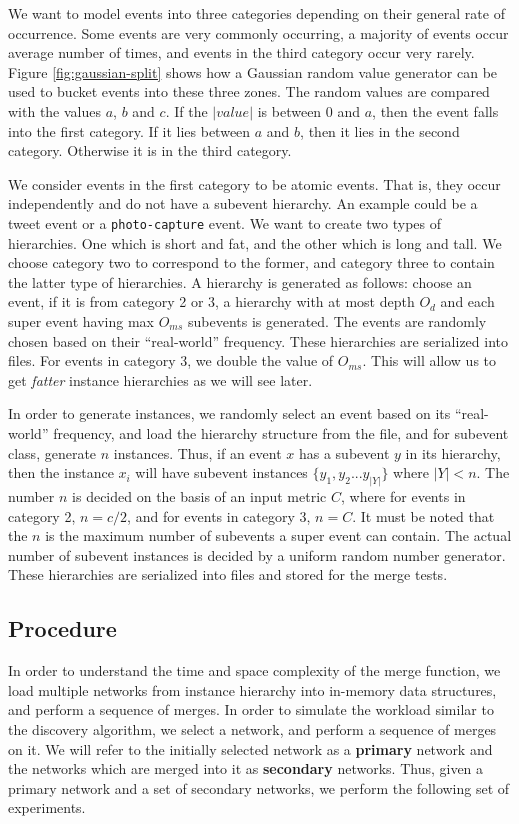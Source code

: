 We want to model events into three categories depending on their general rate of occurrence. Some events are very commonly occurring, a majority of events occur average number of times, and events in the third category occur very rarely. Figure \ref{fig:gaussian-split} shows how a Gaussian random value generator can be used to bucket events into these three zones. The random values are compared with the values $a$, $b$ and $c$. If the $|value|$ is between 0 and $a$, then the event falls into the first category. If it lies between $a$ and $b$, then it lies in the second category. Otherwise it is in the third category.

We consider events in the first category to be atomic events. That is, they occur independently and do not have a subevent hierarchy. An example could be a tweet event or a \texttt{photo-capture} event. We want to create two types of hierarchies. One which is short and fat, and the other which is long and tall. We choose category two to correspond to the former, and category three to contain the latter type of hierarchies. A hierarchy is generated as follows: choose an event, if it is from category 2 or 3, a hierarchy with at most depth $O_d$ and each super event having max $O_{ms}$ subevents is generated. The events are randomly chosen based on their ``real-world'' frequency. These hierarchies are serialized into files. For events in category 3, we double the value of $O_{ms}$. This will allow us to get \textit{fatter} instance hierarchies as we will see later.

In order to generate instances, we randomly select an event based on its ``real-world'' frequency, and load the hierarchy structure from the file, and for subevent class, generate $n$ instances. Thus, if an event $x$ has a subevent $y$ in its hierarchy, then the instance $x_i$ will have subevent instances $\{y_1, y_2 ... y_{|Y|}\}$ where $|Y| < n$. The number $n$ is decided on the basis of an input metric $C$, where for events in category 2, $n = c/2$, and for events in category 3, $n = C$. It must be noted that the $n$ is the maximum number of subevents a super event can contain. The actual number of subevent instances is decided by a uniform random number generator. These hierarchies are serialized into files and stored for the merge tests.

\subsection{Procedure}
In order to understand the time and space complexity of the merge function, we load multiple networks from instance hierarchy into in-memory data structures, and perform a sequence of merges. In order to simulate the workload similar to the discovery algorithm, we select a network, and perform a sequence of merges on it. We will refer to the initially selected network as a \textbf{primary} network and the networks which are merged into it as \textbf{secondary} networks. Thus, given a primary network and a set of secondary networks, we perform the following set of experiments.

